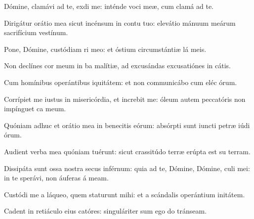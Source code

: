 \item Dómine, clamávi ad te, exdi me:\psstar{} inténde voci meæ, cum clamá ad te.

\item Dirigátur orátio mea sicut incénsum in contu tuo:\psstar{} elevátio mánuum meárum sacrifícium vestínum.

\item Pone, Dómine, custódiam ri meo:\psstar{} et óstium circumstántiæ lá meis.

\item Non declínes cor meum in ba malítiæ,\psstar{} ad excusándas excusatiónes in cátis.

\item Cum homínibus operántibus iquitátem:\psstar{} et non communicábo cum eléc órum.

\item Corrípiet me iustus in misericórdia, et increbit me:\psstar{} óleum autem peccatóris non impínguet ca meum.

\item Quóniam adhuc et orátio mea in benecitis eórum:\psstar{} absórpti sunt iuncti petræ iúdi órum.

\item Audient verba mea quóniam tuérunt:\psstar{} sicut crassitúdo terræ erúpta est su terram.

\item Dissipáta sunt ossa nostra secus inférnum:\pscross{} quia ad te, Dómine, Dómine, culi mei:\psstar{} in te sperávi, non áuferas á meam.

\item Custódi me a láqueo, quem staturunt mihi:\psstar{} et a scándalis operántium initátem.

\item Cadent in retiáculo eius catóres:\psstar{} singuláriter sum ego do tránseam.
